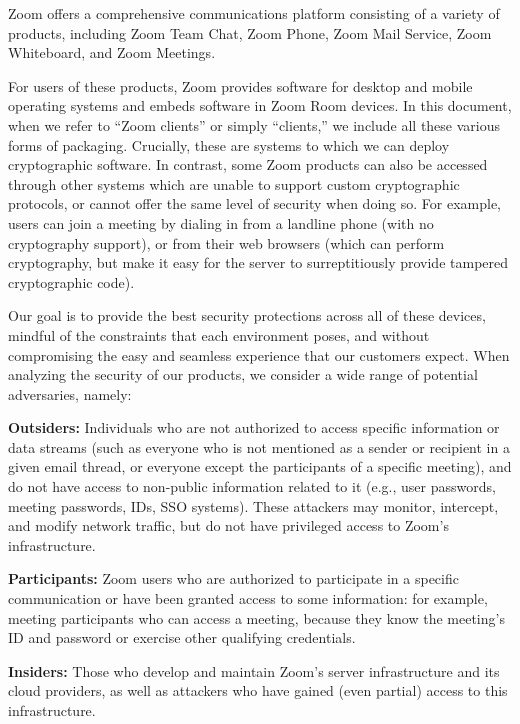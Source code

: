 Zoom offers a comprehensive communications platform consisting of a variety of products, including
Zoom Team Chat, Zoom Phone, Zoom Mail Service, Zoom Whiteboard, and Zoom Meetings.

For users of these products, Zoom provides software for desktop and mobile operating systems and
embeds software in Zoom Room devices. In this document, when we refer to ``Zoom clients'' or simply
``clients,'' we include all these various forms of packaging. Crucially, these are systems to which
we can deploy cryptographic software. In contrast, some Zoom products can also be accessed through
other systems which are unable to support custom cryptographic protocols, or cannot offer the same
level of security when doing so. For example, users can join a meeting by dialing in from a landline
phone (with no cryptography support), or from their web browsers (which can perform cryptography,
but make it easy for the server to surreptitiously provide tampered cryptographic code).

Our goal is to provide the best security protections across all of these devices, mindful of the
constraints that each environment poses, and without compromising the easy and seamless experience
that our customers expect. When analyzing the security of our products, we consider a wide range of
potential adversaries, namely:

\begin{description}
	\item {\bf Outsiders:} Individuals who are not authorized to access specific information or data
	streams (such as everyone who is not mentioned as a sender or recipient in a given email thread,
	or everyone except the participants of a specific meeting), and do not have access to non-public
	information related to it (e.g., user passwords, meeting passwords, IDs, SSO systems). These
	attackers may monitor, intercept, and modify network traffic, but do not have privileged access
	to Zoom's infrastructure.
	\item {\bf Participants:} Zoom users who are authorized to participate in a specific
	communication or have been granted access to some information: for example, meeting participants
	who can access a meeting, because they know the meeting's ID and password or exercise other
	qualifying credentials.
	\item {\bf Insiders:} Those who develop and maintain Zoom's server infrastructure and its cloud
	providers, as well as attackers who have gained (even partial) access to this infrastructure.
\end{description}

